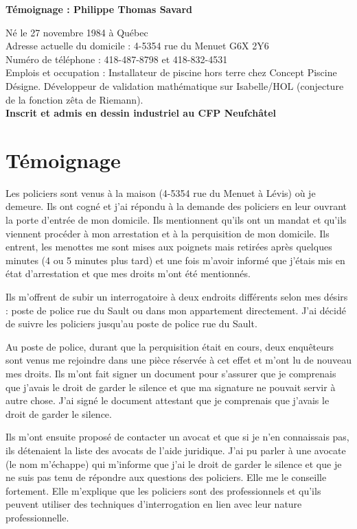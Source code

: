\documentclass[12pt]{article}
\begin{document}
\begin{center}
{\LARGE \textbf{Témoignage : Philippe Thomas Savard}}\


\end{center}

Né le 27 novembre 1984 à Québec\\
Adresse actuelle du domicile : 4-5354 rue du Menuet G6X 2Y6\\
Numéro de téléphone : 418-487-8798 et 418-832-4531\\
Emplois et occupation : Installateur de piscine hors terre chez Concept Piscine Désigne. Développeur de validation mathématique sur Isabelle/HOL (conjecture de la fonction zêta de Riemann).\\
\textbf{Inscrit et admis en dessin industriel au CFP Neufchâtel}\\

\section*{Témoignage}

Les policiers sont venus à la maison (4-5354 rue du Menuet à Lévis) où je demeure. Ils ont cogné et j’ai répondu à la demande des policiers en leur ouvrant la porte d’entrée de mon domicile. Ils mentionnent qu’ils ont un mandat et qu’ils viennent procéder à mon arrestation et à la perquisition de mon domicile. Ils entrent, les menottes me sont mises aux poignets mais retirées après quelques minutes (4 ou 5 minutes plus tard) et une fois m’avoir informé que j’étais mis en état d’arrestation et que mes droits m’ont été mentionnés.

Ils m’offrent de subir un interrogatoire à deux endroits différents selon mes désirs : poste de police rue du Sault ou dans mon appartement directement. J’ai décidé de suivre les policiers jusqu’au poste de police rue du Sault.

Au poste de police, durant que la perquisition était en cours, deux enquêteurs sont venus me rejoindre dans une pièce réservée à cet effet et m’ont lu de nouveau mes droits. Ils m’ont fait signer un document pour s’assurer que je comprenais que j’avais le droit de garder le silence et que ma signature ne pouvait servir à autre chose. J’ai signé le document attestant que je comprenais que j’avais le droit de garder le silence.

Ils m’ont ensuite proposé de contacter un avocat et que si je n’en connaissais pas, ils détenaient la liste des avocats de l’aide juridique. J’ai pu parler à une avocate (le nom m’échappe) qui m’informe que j’ai le droit de garder le silence et que je ne suis pas tenu de répondre aux questions des policiers. Elle me le conseille fortement. Elle m’explique que les policiers sont des professionnels et qu’ils peuvent utiliser des techniques d’interrogation en lien avec leur nature professionnelle.
\end{document}
